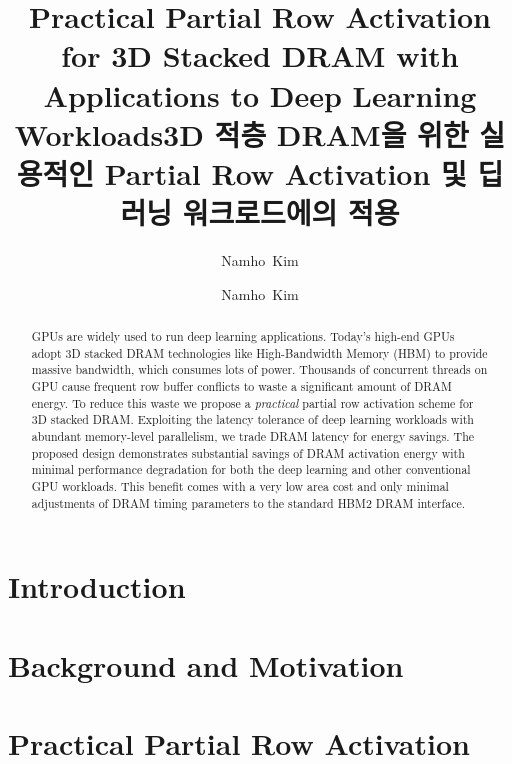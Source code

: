 \documentclass[oneside,ms]{snuthesis_utf8}
\title{Practical Partial Row Activation\\ for 3D Stacked DRAM with Applications to Deep Learning Workloads}
\title*{3D 적층 DRAM을 위한 실용적인 Partial Row Activation 및 딥 러닝 워크로드에의 적용}
\author{Namho~Kim}
\author*{Namho~Kim} %
\begin{document}
\makefrontcover
\makeapproval

\cleardoublepage

\cleardoublepage
{}

\begin{abstract}
GPUs are widely used to run deep learning applications. 
Today's high-end GPUs adopt 3D stacked DRAM technologies like High-Bandwidth Memory (HBM) to provide massive bandwidth, which consumes lots of power. 
Thousands of concurrent threads on GPU cause frequent row buffer conflicts to waste a significant amount of DRAM energy. 
To reduce this waste we propose a \emph{practical} partial row activation scheme for 3D stacked DRAM. 
Exploiting the latency tolerance of deep learning workloads with abundant memory-level parallelism, we trade DRAM latency for energy savings. 
The proposed design demonstrates substantial savings of DRAM activation energy with minimal performance degradation for both the deep learning and other conventional GPU workloads. 
This benefit comes with a very low area cost and only minimal adjustments of DRAM timing parameters to the standard HBM2 DRAM interface.
\end{abstract}
\cleardoublepage

\tableofcontents
{}
\cleardoublepage

\listoftables
{}
\cleardoublepage

\listoffigures
{}
\cleardoublepage


\chapter{Introduction}


\clearpage
\chapter{Background and Motivation}


\chapter{Practical Partial Row Activation}

\end{document}
